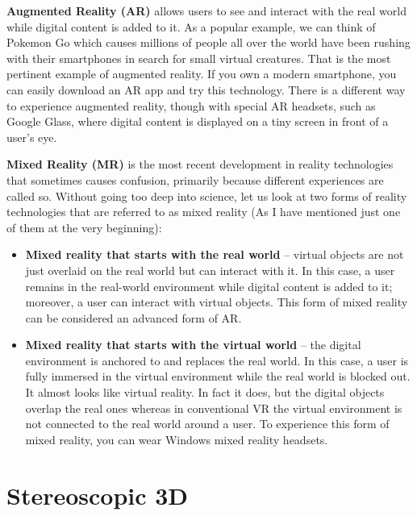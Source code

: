 \par \textbf{Augmented Reality (AR)} allows users to see and interact with the real world while digital content is added to it. As a popular example, we can think of Pokemon Go which causes millions of people all over the world have been rushing with their smartphones in search for small virtual creatures. That is the most pertinent example of augmented reality. \newline
If you own a modern smartphone, you can easily download an AR app and try this technology. There is a different way to experience augmented reality, though  with special AR headsets, such as Google Glass, where digital content is displayed on a tiny screen in front of a user's eye.

\par \textbf{Mixed Reality (MR)} is the most recent development in reality technologies that sometimes causes confusion, primarily because different experiences are called so. Without going too deep into science, let us look at two forms of reality technologies that are referred to as mixed reality (As I have mentioned just one of them at the very beginning):

\begin{itemize}

\item \textbf{ Mixed reality that starts with the real world }– virtual objects are not just overlaid on the real world but can interact with it. In this case, a user remains in the real-world environment while digital content is added to it; moreover, a user can interact with virtual objects. This form of mixed reality can be considered an advanced form of AR.

\item  \textbf{Mixed reality that starts with the virtual world} – the digital environment is anchored to and replaces the real world. In this case, a user is fully immersed in the virtual environment while the real world is blocked out. It almost looks like virtual reality. In fact it does, but the digital objects overlap the real ones whereas in conventional VR the virtual environment is not connected to the real world around a user. To experience this form of mixed reality, you can wear Windows mixed reality headsets. 
\end{itemize}

\section{Stereoscopic 3D}

